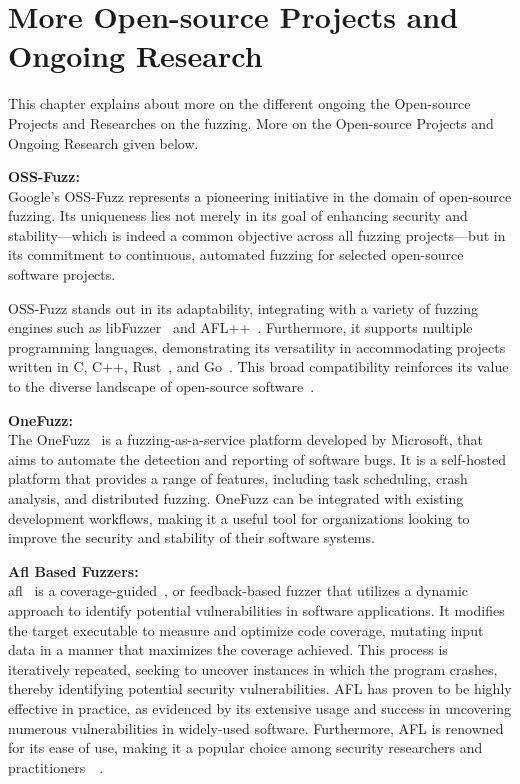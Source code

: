 \clearpage
\vspace{21.5pt}
\chapter{More Open-source Projects and Ongoing Research}\label{appx:fourth}

This chapter explains about more on the different ongoing the Open-source Projects
and Researches on the fuzzing. More on the Open-source Projects and Ongoing
Research given below.


\textbf{OSS-Fuzz:~\cite{GitHubgo49:online}} \\

Google's OSS-Fuzz represents a pioneering initiative in the domain of open-source fuzzing.
Its uniqueness lies not merely in its goal of enhancing security and stability—which is indeed a
common objective across all fuzzing projects—but in its commitment to continuous,
automated fuzzing for selected open-source software projects.

OSS-Fuzz stands out in its adaptability, integrating with a variety of fuzzing engines such as
libFuzzer~\cite{libFuzze17:online} and AFL++~\cite{257204}.
Furthermore, it supports multiple programming languages, demonstrating its versatility in accommodating
projects written in C, C++, Rust~\cite{klabnik2023rust}, and Go~\cite{donovan2015go}. This broad compatibility reinforces its value to the diverse
landscape of open-source software~\cite{ShortInt96:online}.


\textbf{OneFuzz:~\cite{GitHubmi60:online}}\\

The OneFuzz~\cite{GitHubmi60:online} is a fuzzing-as-a-service platform developed by Microsoft, that aims to
automate the detection and reporting of software bugs. It is a self-hosted
platform that provides a range of features, including task scheduling,
crash analysis, and distributed fuzzing. OneFuzz can be integrated with
existing development workflows, making it a useful tool for organizations
looking to improve the security and stability of their software systems.


\textbf{Afl Based Fuzzers:}\\

\acrlong{afl}~\cite{american20:online} is a coverage-guided~\cite{lyu2022ems}, or feedback-based fuzzer that utilizes a
dynamic approach to identify potential vulnerabilities in software applications.
It modifies the target executable to measure and optimize code coverage,
mutating input data in a manner that maximizes the coverage achieved.
This process is iteratively repeated, seeking to uncover instances in
which the program crashes, thereby identifying potential security vulnerabilities.
AFL has proven to be highly effective in practice, as evidenced by its extensive
usage and success in uncovering numerous vulnerabilities in widely-used software.
Furthermore, AFL is renowned for its ease of use, making it a popular choice
among security researchers and practitioners~\cite{american20:online}~\cite{fuzzinga40:online}.

